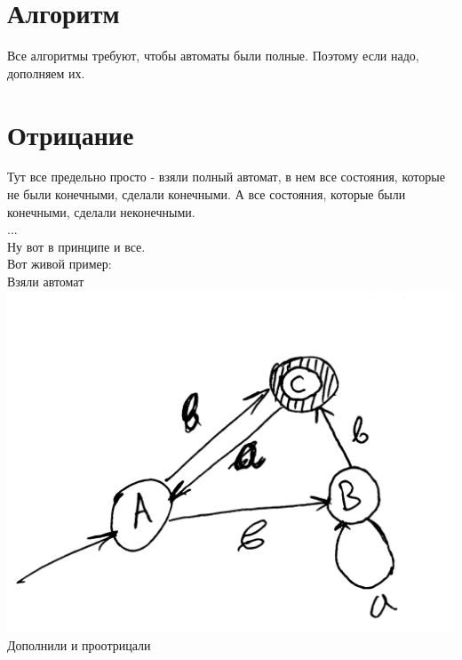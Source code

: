 \documentclass[14pt]{extreport}
\begin{document}
	\section{Алгоритм}
	Все алгоритмы требуют, чтобы автоматы были полные. Поэтому если надо, дополняем их.\\
	\section{Отрицание}
	Тут все предельно просто - взяли полный автомат, в нем все состояния, которые не были
	конечными, сделали конечными. А все состояния, которые были конечными, сделали неконечными.\\
	...\\
	Ну вот в принципе и все.\\
	Вот живой пример:\\
	Взяли автомат\\
	\includegraphics[scale=0.1]{data/pic5_1.png}\\
	Дополнили и проотрицали\\
\end{document}
